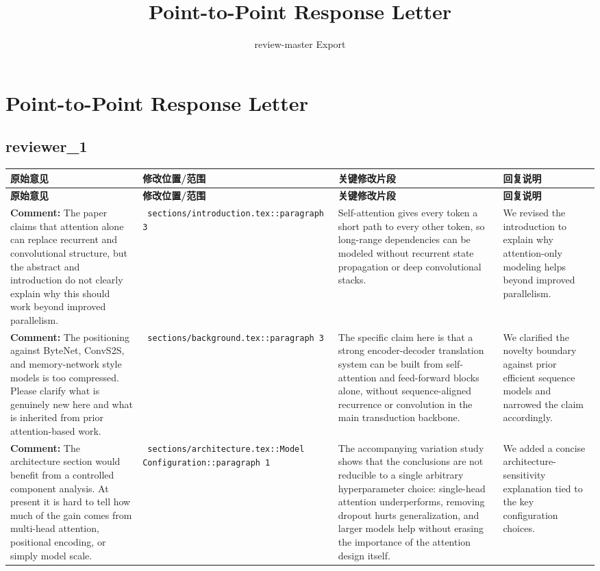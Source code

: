 \documentclass[11pt]{article}
\title{Point-to-Point Response Letter}
\author{review-master Export}
\date{}
\begin{document}
\maketitle

\section*{Point-to-Point Response Letter}

\subsection*{ reviewer_1 }
\begin{longtable}{|p{}|p{}|p{}|p{}|}
\hline
\textbf{原始意见} & \textbf{修改位置/范围} & \textbf{关键修改片段} & \textbf{回复说明} \\
\hline
\endfirsthead
\hline
\textbf{原始意见} & \textbf{修改位置/范围} & \textbf{关键修改片段} & \textbf{回复说明} \\
\hline
\endhead
\textbf{Comment:} The paper claims that attention alone can replace recurrent and convolutional structure, but the abstract and introduction do not clearly explain why this should work beyond improved parallelism. & \texttt{ sections/introduction.tex::paragraph 3 } & {\color{blue}\ttfamily Self-attention gives every token a short path to every other token, so long-range dependencies can be modeled without recurrent state propagation or deep convolutional stacks.} & We revised the introduction to explain why attention-only modeling helps beyond improved parallelism. \\
\hline
\textbf{Comment:} The positioning against ByteNet, ConvS2S, and memory-network style models is too compressed. Please clarify what is genuinely new here and what is inherited from prior attention-based work. & \texttt{ sections/background.tex::paragraph 3 } & {\color{blue}\ttfamily The specific claim here is that a strong encoder-decoder translation system can be built from self-attention and feed-forward blocks alone, without sequence-aligned recurrence or convolution in the main transduction backbone.} & We clarified the novelty boundary against prior efficient sequence models and narrowed the claim accordingly. \\
\hline
\textbf{Comment:} The architecture section would benefit from a controlled component analysis. At present it is hard to tell how much of the gain comes from multi-head attention, positional encoding, or simply model scale. & \texttt{ sections/architecture.tex::Model Configuration::paragraph 1 } & {\color{blue}\ttfamily The accompanying variation study shows that the conclusions are not reducible to a single arbitrary hyperparameter choice: single-head attention underperforms, removing dropout hurts generalization, and larger models help without erasing the importance of the attention design itself.} & We added a concise architecture-sensitivity explanation tied to the key configuration choices. \\

\end{longtable}
\end{document}
